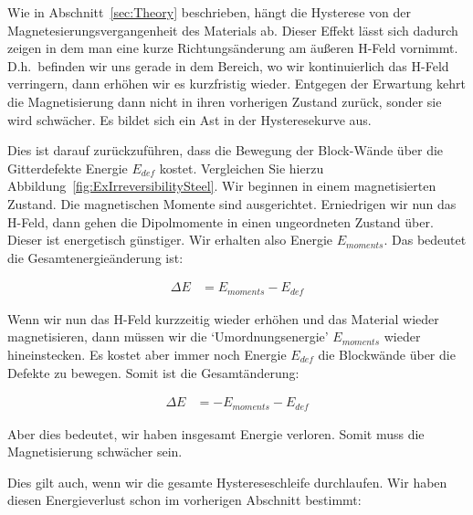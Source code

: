 \documentclass[a4paper,10pt,twocolumn]{article}
\begin{document}
    Wie in Abschnitt~\ref{sec:Theory} beschrieben, hängt die Hysterese von der Magnetesierungsvergangenheit
    des Materials ab.
    Dieser Effekt lässt sich dadurch zeigen in dem man eine kurze Richtungsänderung am äußeren H-Feld vornimmt.
    D.h.\ befinden wir uns gerade in dem Bereich, wo wir kontinuierlich das H-Feld verringern, dann erhöhen wir es
    kurzfristig wieder.
    Entgegen der Erwartung kehrt die Magnetisierung dann nicht in ihren vorherigen Zustand zurück, sonder sie
    wird schwächer.
    Es bildet sich ein Ast in der Hysteresekurve aus.
    
    Dies ist darauf zurückzuführen, dass die Bewegung der Block-Wände über die Gitterdefekte Energie $E_{def}$ kostet.
    Vergleichen Sie hierzu Abbildung~\ref{fig:ExIrreversibilitySteel}.
    Wir beginnen in einem magnetisierten Zustand.
    Die magnetischen Momente sind ausgerichtet.
    Erniedrigen wir nun das H-Feld, dann gehen die Dipolmomente in einen ungeordneten Zustand über.
    Dieser ist energetisch günstiger.
    Wir erhalten also Energie $E_{moments}$.
    Das bedeutet die Gesamtenergieänderung ist:
    
    \begin{align*}
        \Delta E &= E_{moments} - E_{def}
    \end{align*}
    
    Wenn wir nun das H-Feld kurzzeitig wieder erhöhen und das Material wieder magnetisieren, dann müssen wir die
    `Umordnungsenergie' $E_{moments}$ wieder hineinstecken.
    Es kostet aber immer noch Energie $E_{def}$ die Blockwände über die Defekte zu bewegen.
    Somit ist die Gesamtänderung:
    
    \begin{align*}
        \Delta E &= - E_{moments} - E_{def}
    \end{align*}
%    
    
    Aber dies bedeutet, wir haben insgesamt Energie verloren.
    Somit muss die Magnetisierung schwächer sein.
    
    Dies gilt auch, wenn wir die gesamte Hystereseschleife durchlaufen.
    Wir haben diesen Energieverlust schon im vorherigen Abschnitt bestimmt:
    
\end{document}
